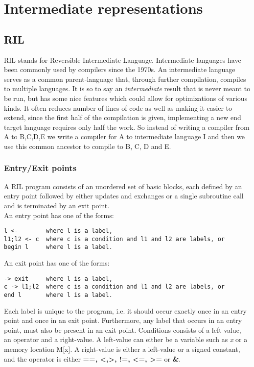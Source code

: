 \section{Intermediate representations}
\label{section - RIL}
\subsection{RIL}
RIL stands for Reversible Intermediate Language.
Intermediate languages have been commonly used by compilers since the 1970s.
An intermediate language serves as a common parent-language that, through further compilation, compiles to multiple languages. It is so to say an \emph{intermediate} result that is never meant to be run, but has some nice features which could allow for optimizations of various kinds. It often reduces number of lines of code as well as making it easier to extend, since the first half of the compilation is given, implementing a new end target language requires only half the work.
So instead of writing a compiler from A to B,C,D,E we write a compiler for A to intermediate language I and then we use this common ancestor to compile to B, C, D and E.
\subsubsection{Entry/Exit points}
A RIL program consists of an unordered set of basic blocks, each defined by an entry point followed by either updates and exchanges or a single subroutine call and is terminated by an exit point\cite{10.1007/978-3-319-41579-6_16}. \\
An entry point has one of the forms:
\begin{verbatim}
l <-        where l is a label,
l1;l2 <- c  where c is a condition and l1 and l2 are labels, or
begin l     where l is a label.
\end{verbatim}
An exit point has one of the forms:
\begin{verbatim}
-> exit     where l is a label,
c -> l1;l2  where c is a condition and l1 and l2 are labels, or
end l       where l is a label.
\end{verbatim}

Each label is unique to the program, i.e. it should occur exactly once in an entry point and once in an exit point.
Furthermore, any label that occurs in an entry point, must also be present in an exit point.
Conditions consists of a left-value, an operator and a right-value.
A left-value can either be a variable such as \emph{x} or a memory location M[x].
A right-value is either a left-value or a signed constant, and the operator is either \textbf{==, <,>, !=, <=, >=} or \textbf{\&}.

